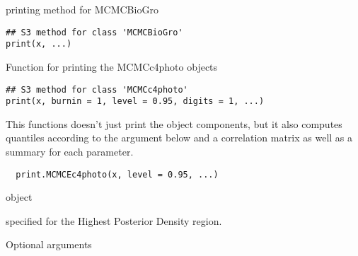 \documentclass[letterpaper]{book}
\begin{document}
%
\begin{Description}\relax
printing method for MCMCBioGro
\end{Description}
%
\begin{Usage}
\begin{verbatim}
## S3 method for class 'MCMCBioGro'
print(x, ...)
\end{verbatim}
\end{Usage}
%
\begin{Arguments}
\begin{ldescription}
\item[\code{x}] 
\end{ldescription}
\end{Arguments}
%
\begin{Description}\relax
Function for printing the MCMCc4photo objects
\end{Description}
%
\begin{Usage}
\begin{verbatim}
## S3 method for class 'MCMCc4photo'
print(x, burnin = 1, level = 0.95, digits = 1, ...)
\end{verbatim}
\end{Usage}
%
\begin{Description}\relax
This functions doesn't just print the object components,
but it also computes quantiles according to the
 argument below and a correlation matrix as
well as a summary for each parameter.
\end{Description}
%
\begin{Usage}
\begin{verbatim}
  print.MCMCEc4photo(x, level = 0.95, ...)
\end{verbatim}
\end{Usage}
%
\begin{Arguments}
\begin{ldescription}
\item[\code{x}]  object

\item[\code{level}] specified  for the Highest
Posterior Density region.

\item[\code{...}] Optional arguments
\end{ldescription}
\end{Arguments}
\end{document}
